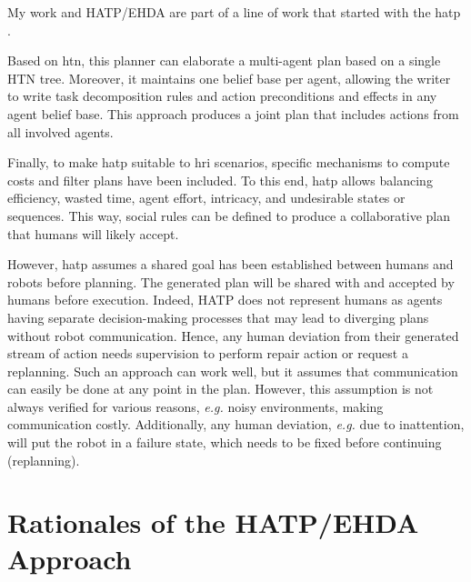 My work and HATP/EHDA are part of a line of work that started with the \acrfull{hatp} \cite{alili2009task,lallement2014hatp}.

Based on \acrfull{htn}, this planner can elaborate a multi-agent plan based on a single HTN tree. Moreover, it maintains one belief base per agent, allowing the writer to write task decomposition rules and action preconditions and effects in any agent belief base. This approach produces a joint plan that includes actions from all involved agents. 

Finally, to make \acrshort{hatp} suitable to \acrshort{hri} scenarios, specific mechanisms to compute costs and filter plans have been included. To this end, \acrshort{hatp} allows balancing efficiency, wasted time, agent effort, intricacy, and undesirable states or sequences. This way, social rules can be defined to produce a collaborative plan that humans will likely accept. 

However, \acrshort{hatp} assumes a shared goal has been established between humans and robots before planning. The generated plan will be shared with and accepted by humans before execution. Indeed, HATP does not represent humans as agents having separate decision-making processes that may lead to diverging plans without robot communication. Hence, any human deviation from their generated stream of action needs supervision to perform repair action or request a replanning. Such an approach can work well, but it assumes that communication can easily be done at any point in the plan. However, this assumption is not always verified for various reasons, \textit{e.g.} noisy environments, making communication costly.
Additionally, any human deviation, \textit{e.g.} due to inattention, will put the robot in a failure state, which needs to be fixed before continuing (replanning).

\section{Rationales of the HATP/EHDA Approach}

